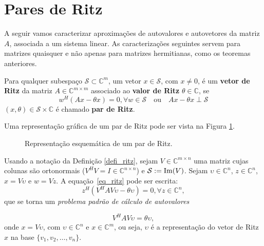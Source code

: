\section{Pares de Ritz}\label{sec_parritz}

 A seguir vamos caracterizar aproximaç\~{o}es de autovalores e autovetores da matriz $A$, associada a um sistema linear. As caracterizaç\~{o}es seguintes servem para matrizes quaisquer e não apenas para matrizes hermitianas, como os teoremas anteriores.
\begin{defi}\label{defi_ritz}
Para qualquer subespaço $\mathcal{S}\subset \mathbb{C}^m$, um vetor $x \in \mathcal{S}$, com $x\ne 0$, é um \textbf{vetor de Ritz} da
matriz $A\in \mathbb{C}^{m\times m} $ associado ao \textbf{valor de Ritz} $\theta\in \mathbb{C}$,  se
\begin{equation}\label{eq_ritz}
   w^H(Ax - \theta x) = 0, \forall w \in \mathcal{S} \quad\text{ou}\quad Ax - \theta x\perp \mathcal{S}
\end{equation}
  $(x,\theta)\in \mathcal{S}\times \mathbb{C}$ é chamado \textbf{par de Ritz}.
\end{defi}
Uma representação gráfica de um par de Ritz pode ser vista na Figura \ref{fig_ritzpair}. %

\begin{figure}[htb]
  \caption{Representação esquemática de um par de Ritz.}\label{fig_ritzpair}
\end{figure}

\begin{obs}\label{obs_ritzpair}
Usando a notação da Definição \ref{defi_ritz}, sejam $V\in \mathbb{C}^{m\times n}$  uma matriz cujas colunas são ortonormais ($V^HV=I\in \mathbb{C}^{n\times n}$) e  $\mathcal{S}:=\operatorname{Im}(V)$.
 Sejam $\upsilon\in \mathbb{C}^{n}$, $z\in \mathbb{C}^{n}$, $x = V\upsilon$ e $w = Vz$. A equação~\eqref{eq_ritz}
pode ser escrita:
\begin{equation}\label{eq_ritzrepre}
z^H (V^HAV\upsilon - \theta \upsilon) = 0, \forall z\in \mathbb{C}^{n},
\end{equation}
\noindent que se torna um \emph{problema padrão de cálculo de autovalores}

 \begin{equation}\label{eq_rayleighritzritz}
V^HAV\upsilon = \theta\upsilon,
\end{equation}
onde  $x=V\upsilon$, com $\upsilon\in\mathbb{C}^{n}$ e $x\in\mathbb{C}^{m}$, ou seja, $\upsilon$ é  a
representação do vetor de Ritz $x$ na base $\{v_1,v_2,\ldots,v_n\}$.
\end{obs}

